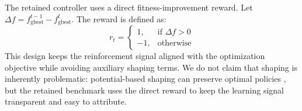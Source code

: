 \documentclass[final,5p,times]{elsarticle}
\begin{document}
The retained controller uses a direct fitness-improvement reward. Let $\Delta f = f_{\text{gbest}}^{t-1} - f_{\text{gbest}}^{t}$. The reward is defined as:
\begin{equation}
r_t =
\begin{cases}
1, & \text{if } \Delta f > 0 \\
-1, & \text{otherwise}
\end{cases}
\label{eq:reward_total}
\end{equation}
This design keeps the reinforcement signal aligned with the optimization objective while avoiding auxiliary shaping terms.
We do not claim that shaping is inherently problematic: potential-based shaping can preserve optimal policies \cite{Ng1999Policy}, but the retained benchmark uses the direct reward to keep the learning signal transparent and easy to attribute.
\end{document}
